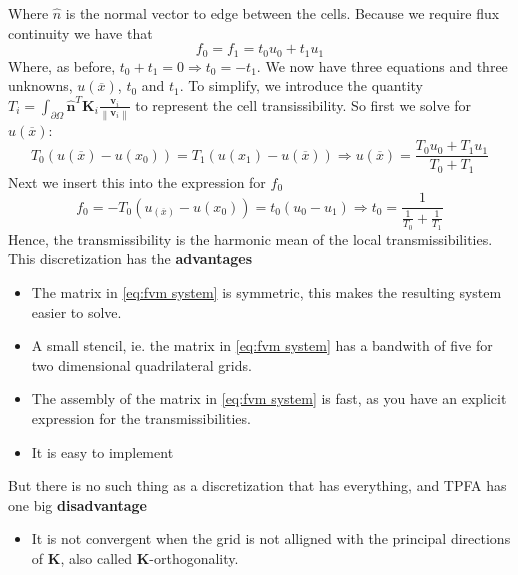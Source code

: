 \documentclass[../Main/main.tex]{subfiles}
\begin{document}
Where $\hat{n}$ is the normal vector to edge between the cells.
Because we require flux continuity we have that 
\begin{equation}
	f_0 = f_1 = t_0 u_0 + t_1 u_1
\end{equation}
Where, as before, $t_0 + t_1 = 0 \Rightarrow t_0 = -t_1$. We now have three equations and three unknowns, $u(\overline{x})$, $t_0$ and $t_1$. To simplify, we introduce the quantity $T_i = \int_{\partial \Omega} \hat{\pmb{n}}^T \pmb{K}_i  \frac{\pmb{v}_i}{\left \| \pmb{v}_i \right \|} $ to represent the cell transissibility. So first we solve for $u(\overline{x})$:
\begin{equation}
	T_0(u(\overline{x})-u(x_0)) = T_1(u(x_1)-u(\overline{x})) \Rightarrow u(\overline{x}) = \frac{T_0 u_0 + T_1 u_1}{T_0 + T_1}
\end{equation}
Next we insert this into the expression for $f_0$ 
\begin{equation}
	f_0 = -T_0(u_(\overline{x})-u(x_0)) = t_0(u_0 - u_1) \Rightarrow t_0 = \frac{1}{\frac{1}{T_0}+\frac{1}{T_1}}
\end{equation}
Hence, the transmissibility is the harmonic mean of the local transmissibilities. This discretization has the \textbf{advantages}
\begin{itemize}
	\item The matrix in \eqref{eq:fvm system} is symmetric, this makes the resulting system easier to solve.
	\item A small stencil, ie. the matrix in \eqref{eq:fvm system} has a bandwith of five for two dimensional quadrilateral grids.
	\item The assembly of the matrix in \eqref{eq:fvm system} is fast, as you have an explicit expression for the transmissibilities.
	\item It is easy to implement
\end{itemize}
But there is no such thing as a discretization that has everything, and TPFA has one big \textbf{disadvantage}
\begin{itemize}
	\item It is not convergent when the grid is not alligned with the principal directions of $\pmb{K}$, also called $\pmb{K}$-orthogonality.
\end{itemize}
\end{document}
